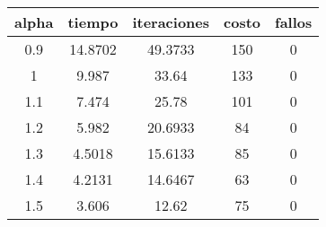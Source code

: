 \begin{table}[h!]
\centering
\begin{tabular}{ccccc}
alpha & tiempo & iteraciones & costo & fallos \\ 
\hline 
0.9 & 14.8702 & 49.3733 & 150 & 0 \\ 
1 & 9.987 & 33.64 & 133 & 0 \\ 
1.1 & 7.474 & 25.78 & 101 & 0 \\ 
1.2 & 5.982 & 20.6933 & 84 & 0 \\ 
1.3 & 4.5018 & 15.6133 & 85 & 0 \\ 
1.4 & 4.2131 & 14.6467 & 63 & 0 \\ 
1.5 & 3.606 & 12.62 & 75 & 0 \\ 
\hline 
\end{tabular}
\end{table}